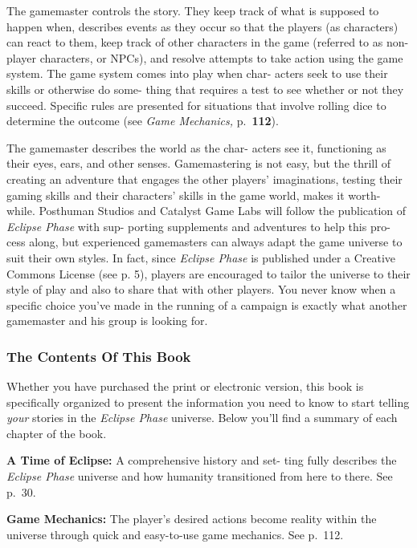 The gamemaster controls the story. They keep track 
of what is supposed to happen when, describes events 
as they occur so that the players (as characters) can 
react to them, keep track of other characters in the 
game (referred to as non-player characters, or NPCs), 
and resolve attempts to take action using the game 
system. The game system comes into play when char-
acters seek to use their skills or otherwise do some-
thing that requires a test to see whether or not they 
succeed. Specific rules are presented for situations that 
involve rolling dice to determine the outcome (see 
\textit{Game Mechanics,} p. \textbf{112}).

The gamemaster describes the world as the char-
acters see it, functioning as their eyes, ears, and other 
senses. Gamemastering is not easy, but the thrill of 
creating an adventure that engages the other players' 
imaginations, testing their gaming skills and their 
characters' skills in the game world, makes it worth-
while. Posthuman Studios and Catalyst Game Labs 
will follow the publication of \textit{Eclipse Phase} with sup-
porting supplements and adventures to help this pro-
cess along, but experienced gamemasters can always 
adapt the game universe to suit their own styles. In 
fact, since \textit{Eclipse Phase} is published under a Creative 
Commons License (see p. 5), players are encouraged 
to tailor the universe to their style of play and also 
to share that with other players. You never know 
when a specific choice you've made in the running of 
a campaign is exactly what another gamemaster and 
his group is looking for.

\subsubsection{The Contents Of This Book}

Whether you have purchased the print or electronic 
version, this book is specifically organized to present 
the information you need to know to start telling 
\textit{your} stories in the \textit{Eclipse Phase} universe. Below 
you'll find a summary of each chapter of the book.

\textbf{A Time of Eclipse:} A comprehensive history and set-
ting fully describes the \textit{Eclipse Phase} universe and how 
humanity transitioned from here to there. See p. 30.

\textbf{Game Mechanics:} The player's desired actions 
become reality within the universe through quick and 
easy-to-use game mechanics. See p. 112.

